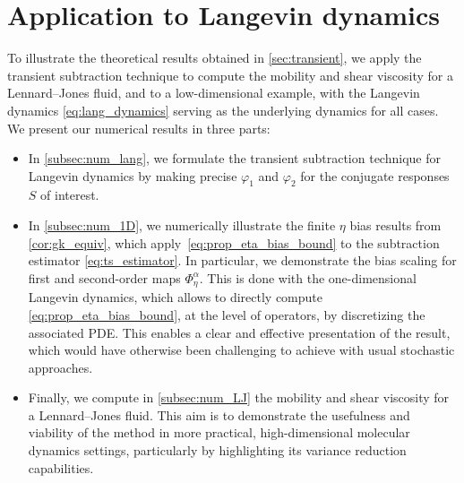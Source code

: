 \section{Application to Langevin dynamics}
\label{sec:numerical_lang}
%
To illustrate the theoretical results obtained in \cref{sec:transient}, we apply the transient subtraction technique to compute the mobility and shear viscosity for a Lennard--Jones fluid, and to a low-dimensional example, with the Langevin dynamics \eqref{eq:lang_dynamics} serving as the underlying dynamics for all cases. We present our numerical results in three parts:
%
\begin{itemize}
	\item In \cref{subsec:num_lang}, we formulate the transient subtraction technique for Langevin dynamics by making precise $\varphi_1$ and $\varphi_2$ for the conjugate responses $S$ of interest.
	 \item In \cref{subsec:num_1D}, we numerically illustrate the finite $\eta$ bias results from \cref{cor:gk_equiv}, which apply~\eqref{eq:prop_eta_bias_bound} to the subtraction estimator \eqref{eq:ts_estimator}. In particular, we demonstrate the bias scaling for first and second-order maps $\Phi_\eta^\alpha$. This is done with the one-dimensional Langevin dynamics, which allows to directly compute \eqref{eq:prop_eta_bias_bound}, at the level of operators, by discretizing the associated PDE. This enables a clear and effective presentation of the result, which would have otherwise been challenging to achieve with usual stochastic approaches. %
	 \item Finally, we compute in \cref{subsec:num_LJ} the mobility and shear viscosity for a Lennard--Jones fluid. This aim is to demonstrate the usefulness and viability of the method in more practical, high-dimensional molecular dynamics settings, particularly by highlighting its variance reduction capabilities.
%
\end{itemize}


